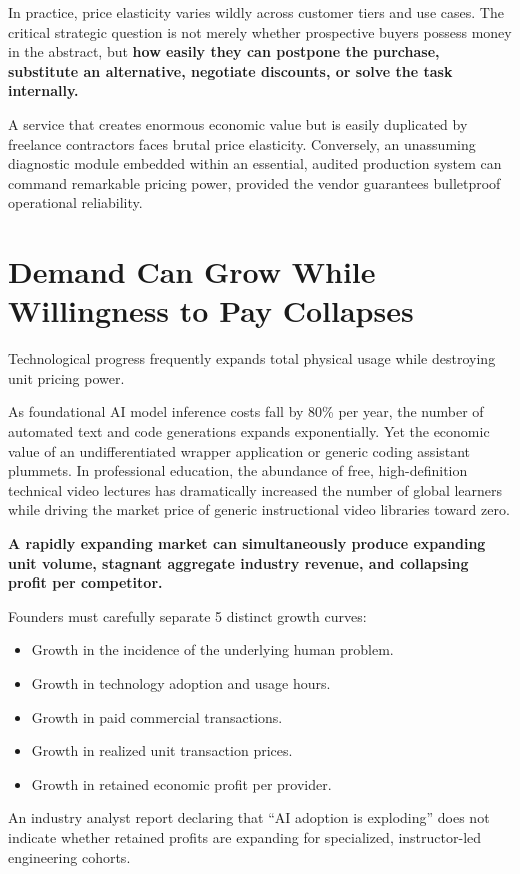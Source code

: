 In practice, price elasticity varies wildly across customer tiers and use cases. The critical strategic question is not merely whether prospective buyers possess money in the abstract, but \textbf{how easily they can postpone the purchase, substitute an alternative, negotiate discounts, or solve the task internally.}

A service that creates enormous economic value but is easily duplicated by freelance contractors faces brutal price elasticity. Conversely, an unassuming diagnostic module embedded within an essential, audited production system can command remarkable pricing power, provided the vendor guarantees bulletproof operational reliability.

\section{Demand Can Grow While Willingness to Pay Collapses}

Technological progress frequently expands total physical usage while destroying unit pricing power.

As foundational AI model inference costs fall by 80\% per year, the number of automated text and code generations expands exponentially. Yet the economic value of an undifferentiated wrapper application or generic coding assistant plummets. In professional education, the abundance of free, high-definition technical video lectures has dramatically increased the number of global learners while driving the market price of generic instructional video libraries toward zero.

\textbf{A rapidly expanding market can simultaneously produce expanding unit volume, stagnant aggregate industry revenue, and collapsing profit per competitor.}

Founders must carefully separate 5 distinct growth curves:
\begin{itemize}[leftmargin=12pt,itemsep=1pt,topsep=1pt]
  \item Growth in the incidence of the underlying human problem.
  \item Growth in technology adoption and usage hours.
  \item Growth in paid commercial transactions.
  \item Growth in realized unit transaction prices.
  \item Growth in retained economic profit per provider.
\end{itemize}

An industry analyst report declaring that ``AI adoption is exploding'' does not indicate whether retained profits are expanding for specialized, instructor-led engineering cohorts.


